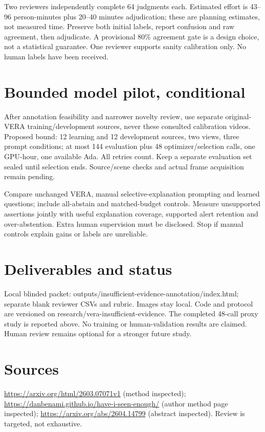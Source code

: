 \documentclass[11pt]{article}
\begin{document}
Two reviewers independently complete 64 judgments each. Estimated effort is 43--96 person-minutes plus 20--40 minutes adjudication; these are planning estimates, not measured time. Preserve both initial labels, report confusion and raw agreement, then adjudicate. A provisional 80\% agreement gate is a design choice, not a statistical guarantee. One reviewer supports sanity calibration only. No human labels have been received.
\section{Bounded model pilot, conditional}
After annotation feasibility and narrower novelty review, use separate original-VERA training/development sources, never these consulted calibration videos. Proposed bound: 12 learning and 12 development sources, two views, three prompt conditions; at most 144 evaluation plus 48 optimizer/selection calls, one GPU-hour, one available Ada. All retries count. Keep a separate evaluation set sealed until selection ends. Source/scene checks and actual frame acquisition remain pending.

Compare unchanged VERA, manual selective-explanation prompting and learned questions; include all-abstain and matched-budget controls. Measure unsupported assertions jointly with useful explanation coverage, supported alert retention and over-abstention. Extra human supervision must be disclosed. Stop if manual controls explain gains or labels are unreliable.
\section{Deliverables and status}
Local blinded packet: outputs/insufficient-evidence-annotation/index.html; separate blank reviewer CSVs and rubric. Images stay local. Code and protocol are versioned on research/vera-insufficient-evidence. The completed 48-call proxy study is reported above. No training or human-validation results are claimed. Human review remains optional for a stronger future study.
\section{Sources}
\url{https://arxiv.org/html/2603.07071v1} (method inspected); \url{https://danbenami.github.io/have-i-seen-enough/} (author method page inspected); \url{https://arxiv.org/abs/2604.14799} (abstract inspected). Review is targeted, not exhaustive.
\end{document}
